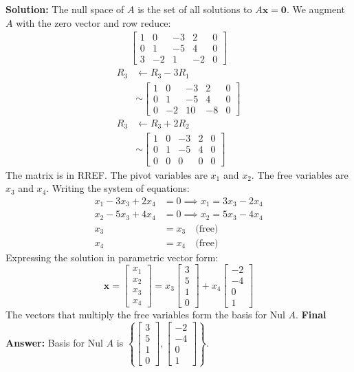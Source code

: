 \documentclass[12pt]{article}
\begin{document}
\textbf{Solution:}
The null space of $A$ is the set of all solutions to $A\mathbf{x} = \mathbf{0}$. We augment $A$ with the zero vector and row reduce:
\begin{align*}
\begin{bmatrix} 1 & 0 & -3 & 2 & 0 \\ 0 & 1 & -5 & 4 & 0 \\ 3 & -2 & 1 & -2 & 0 \end{bmatrix}
\end{align*}
\begin{align*}
R_3 &\leftarrow R_3 - 3R_1 \\
&\sim \begin{bmatrix} 1 & 0 & -3 & 2 & 0 \\ 0 & 1 & -5 & 4 & 0 \\ 0 & -2 & 10 & -8 & 0 \end{bmatrix} \\
R_3 &\leftarrow R_3 + 2R_2 \\
&\sim \begin{bmatrix} 1 & 0 & -3 & 2 & 0 \\ 0 & 1 & -5 & 4 & 0 \\ 0 & 0 & 0 & 0 & 0 \end{bmatrix}
\end{align*}
The matrix is in RREF. The pivot variables are $x_1$ and $x_2$. The free variables are $x_3$ and $x_4$.
Writing the system of equations:
\begin{align*}
x_1 - 3x_3 + 2x_4 &= 0 \implies x_1 = 3x_3 - 2x_4 \\
x_2 - 5x_3 + 4x_4 &= 0 \implies x_2 = 5x_3 - 4x_4 \\
x_3 &= x_3 \quad \text{(free)} \\
x_4 &= x_4 \quad \text{(free)}
\end{align*}
Expressing the solution in parametric vector form:
\[ \mathbf{x} = \begin{bmatrix} x_1 \\ x_2 \\ x_3 \\ x_4 \end{bmatrix} = x_3 \begin{bmatrix} 3 \\ 5 \\ 1 \\ 0 \end{bmatrix} + x_4 \begin{bmatrix} -2 \\ -4 \\ 0 \\ 1 \end{bmatrix} \]
The vectors that multiply the free variables form the basis for Nul $A$.
\textbf{Final Answer:} Basis for Nul $A$ is $\left\{ \begin{bmatrix} 3 \\ 5 \\ 1 \\ 0 \end{bmatrix}, \begin{bmatrix} -2 \\ -4 \\ 0 \\ 1 \end{bmatrix} \right\}$.
\end{document}
